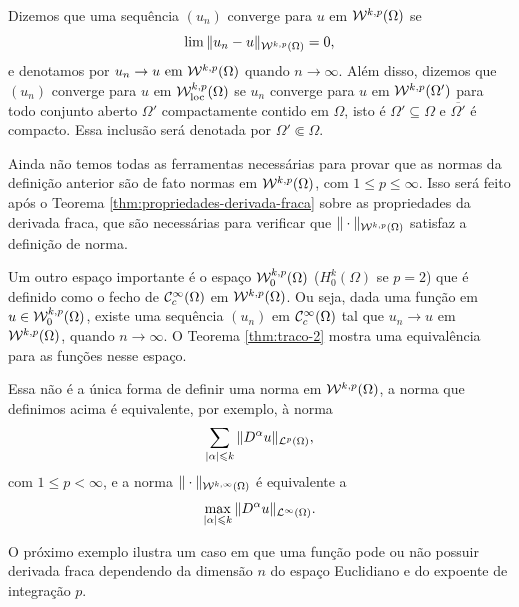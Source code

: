 \obs Dizemos que uma sequência $(u_n)$ converge para $u$ em $\mathcal{W}^{k,p}(\Omega)$ se
\[
    \lim \Vert u_n - u \Vert_{\mathcal{W}^{k,p}(\Omega)} = 0,
\]
e denotamos por $u_n \to u \text{ em } \mathcal{W}^{k,p}(\Omega)$ quando $n \to \infty$.
Além disso, dizemos que $(u_n)$ converge para $u$ em $\mathcal{W}^{k,p}_{\mathrm{loc}}(\Omega)$ se $u_n$ converge para $u$ em $\mathcal{W}^{k,p}(\Omega')$ para todo conjunto aberto $\Omega'$ compactamente contido em $\Omega$, isto é $\Omega' \subseteq \Omega$ e $\overline{\Omega'}$ é compacto. Essa inclusão será denotada por $\Omega' \Subset \Omega$.

Ainda não temos todas as ferramentas necessárias para provar que as normas da definição anterior são de fato normas em $\mathcal{W}^{k,p}(\Omega)$, com $1 \leqslant p \leqslant \infty$. Isso será feito após o Teorema \ref{thm:propriedades-derivada-fraca} sobre as propriedades da derivada fraca, que são necessárias para verificar que $\Vert \cdot \Vert_{\mathcal{W}^{k,p}(\Omega)}$ satisfaz a definição de norma.

Um outro espaço importante é o espaço $\mathcal{W}^{k,p}_0(\Omega)$ ($H^k_0(\Omega)$ se $p = 2$) que é definido como o fecho de $\mathcal{C}^{\infty}_c(\Omega)$ em $\mathcal{W}^{k,p}(\Omega)$. Ou seja, dada uma função em $u \in \mathcal{W}^{k,p}_0(\Omega)$, existe uma sequência $(u_n)$ em $\mathcal{C}^{\infty}_c(\Omega)$ tal que $u_n \to u$ em $\mathcal{W}^{k,p}(\Omega)$, quando $n \to \infty$.
O Teorema \ref{thm:traco-2} mostra uma equivalência para as funções nesse espaço.

\obs Essa não é a única forma de definir uma norma em $\mathcal{W}^{k,p}(\Omega)$, a norma que definimos acima é equivalente, por exemplo, à norma
\[
    \sum_{|\alpha| \leqslant k} \Vert D^\alpha u \Vert_{\mathcal{L}^p(\Omega)},
\]
com $1 \leqslant p < \infty$, e a norma $\Vert \cdot \Vert_{\mathcal{W}^{k,\infty}(\Omega)}$ é equivalente a
\[
    \max_{|\alpha|\leqslant k} \Vert D^\alpha u \Vert_{\mathcal{L}^\infty(\Omega)}.
\]

O próximo exemplo ilustra um caso em que uma função pode ou não possuir derivada fraca dependendo da dimensão $n$ do espaço Euclidiano e do expoente de integração $p$.

